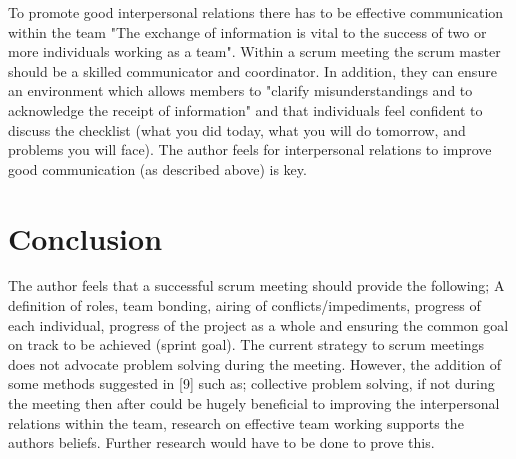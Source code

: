 \documentclass{scrartcl}
\begin{document}
To promote good interpersonal relations there has to be effective communication within the team "The exchange of information is vital to the success of two or more individuals working as a team"\cite [p. x]{fletcher2006effects}. Within a scrum meeting the scrum master should be a skilled communicator and coordinator. In addition, they can ensure an environment which allows members to "clarify misunderstandings and to acknowledge the receipt of information" \cite [p. x]{fletcher2006effects} and that individuals feel confident to discuss the checklist (what you did today, what you will do tomorrow, and problems you will face). The author feels for interpersonal relations to improve good communication (as described above) is key. 


\section{Conclusion}
The author feels that a successful scrum meeting should provide the following; A definition of roles, team bonding, airing of conflicts/impediments, progress of each individual, progress of the project as a whole and ensuring the common goal on track to be achieved (sprint goal).  The current strategy to scrum meetings does not advocate problem solving during the meeting. However, the addition of some methods suggested in [9] such as; collective problem solving, if not during the meeting then after could be hugely beneficial to improving the interpersonal relations within the team, research on effective team working supports the authors beliefs. Further research would have to be done to prove this.



\end{document}
